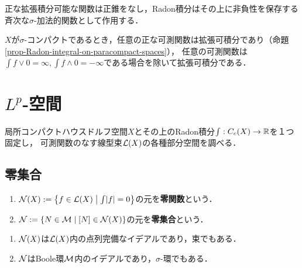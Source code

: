 \documentclass[uplatex,dvipdfmx]{jsreport}
\begin{document}
\begin{lemma}
    正な拡張積分可能な関数は正錐をなし，Radon積分はその上に非負性を保存する斉次な$\sigma$-加法的関数として作用する．
\end{lemma}

\begin{lemma}
    $X$が$\sigma$-コンパクトであるとき，任意の正な可測関数は拡張可積分であり（命題\ref{prop-Radon-integral-on-paracompact-spaces}），
    任意の可測関数は$\int f\lor0=\infty,\int f\land0=-\infty$である場合を除いて拡張可積分である．
\end{lemma}

\section{$L^p$-空間}

\begin{tcolorbox}[colframe=ForestGreen, colback=ForestGreen!10!white,breakable,colbacktitle=ForestGreen!40!white,coltitle=black,fonttitle=\bfseries\sffamily,
title=]
    局所コンパクトハウスドルフ空間$X$とその上のRadon積分$\int:C_c(X)\to\mathbb{R}$を１つ固定し，
    可測関数のなす線型束$\mathcal{L}(X)$の各種部分空間を調べる．
\end{tcolorbox}

\subsection{零集合}

\begin{definition}\mbox{}
    \begin{enumerate}
        \item $\mathcal{N}(X):=\left\{f\in\mathcal{L}(X)\;\middle|\;\int\lvert f\rvert=0\right\}$の元を\textbf{零関数}という．
        \item $\mathcal{N}:=\left\{N\in\mathcal{M}\mid[N]\in\mathcal{N}(X)\right\}$の元を\textbf{零集合}という．
    \end{enumerate}
\end{definition}

\begin{lemma}\mbox{}
    \begin{enumerate}
        \item $\mathcal{N}(X)$は$\mathcal{L}(X)$内の点列完備なイデアルであり，束でもある．
        \item $\mathcal{N}$はBoole環$\mathcal{M}$内のイデアルであり，$\sigma$-環でもある．
    \end{enumerate}
\end{lemma}
\end{document}
